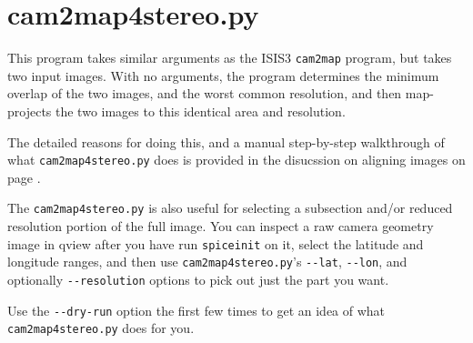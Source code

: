 \clearpage

\section{cam2map4stereo.py}
\label{cam2map4stereo}

This program takes similar arguments as the ISIS3 \texttt{cam2map} program,
but takes two input images.  With no arguments, the program determines
the minimum overlap of the two images, and the worst common resolution,
and then map-projects the two images to this identical area and resolution.

The detailed reasons for doing this, and a manual step-by-step walkthrough of
what \texttt{cam2map4stereo.py} does is provided in the disucssion on aligning images on page \pageref{sec:AligningImages}.

The \texttt{cam2map4stereo.py} is also useful for selecting a subsection and/or reduced resolution portion of the full image.  You can inspect a raw camera geometry image in qview after you have run \texttt{spiceinit} on it, select the latitude and longitude ranges, and then use \texttt{cam2map4stereo.py}'s \texttt{-\/-lat}, \texttt{-\/-lon}, and optionally \texttt{-\/-resolution} options to pick out just the part you want.

Use the \texttt{-\/-dry-run} option the first few times to get an idea of what \texttt{cam2map4stereo.py} does for you.

